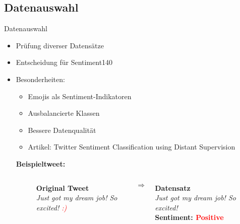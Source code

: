 \documentclass[aspectratio=169]{beamer} %
\begin{document}
\subsection{Datenauswahl}
\begin{frame}{Datenauswahl}
  \begin{itemize}
      \item Prüfung diverser Datensätze
      \item Entscheidung für \glqq Sentiment140\grqq
      \item Besonderheiten:
      \begin{itemize}
          \item Emojis als Sentiment-Indikatoren
          \item Ausbalancierte Klassen
          \item Bessere Datenqualität
          \item Artikel: \glqq Twitter Sentiment Classification using Distant Supervision\grqq
      \end{itemize}

      \vspace{0.5cm}
  \textbf{Beispieltweet:}
  \vspace{0.2cm}

\begin{figure}
    \centering
    \begin{columns}[T]
        \begin{column}{0.45\textwidth}
            \centering
            \textbf{Original Tweet}\\
            \textit{Just got my dream job! So excited! \textcolor{red}{:)}}
            \vspace{0.5cm}
        \end{column}
        
        \begin{column}{0.1\textwidth}
            \centering
            \LARGE $\Rightarrow$
        \end{column}
        
        \begin{column}{0.45\textwidth}
            \centering
            \textbf{Datensatz}\\
            \textit{Just got my dream job! So excited!} \\
            \vspace{0.2cm}
            \textbf{Sentiment: \textcolor{red}{Positive}}
            \vspace{0.5cm}
        \end{column}
    \end{columns}
\end{figure}

  \end{itemize}
\end{frame}
\end{document}
